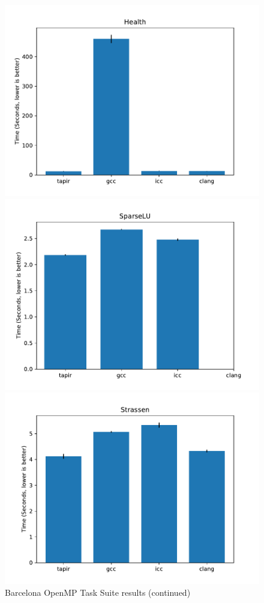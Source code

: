 \documentclass[sigconf]{acmart}
\begin{document}
\begin{figure}
\begin{multicols}{2}
  \includegraphics[width=\linewidth]{health.pdf} \par
  \includegraphics[width=\linewidth]{sparselu.pdf} 
\end{multicols}
\centering
\includegraphics[width=0.45\linewidth]{strassen.pdf}
\caption{Barcelona OpenMP Task Suite results (continued)}
\label{fig:results2}
\end{figure}
\end{document}
